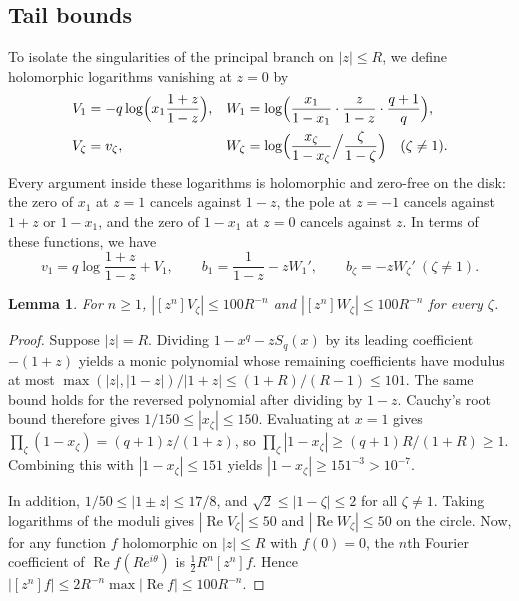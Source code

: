 \documentclass[11pt]{amsart}
\newtheorem{lemma}[theorem]{Lemma}
\theoremstyle{remark}
\begin{document}
\subsection{Tail bounds}
To isolate the singularities of the principal branch on $|z|\le R$, we define
holomorphic logarithms vanishing at $z=0$ by
\begin{align*}
 V_1&=-q\log\Bigl(x_1\frac{1+z}{1-z}\Bigr), &
 W_1&=\log\Bigl(\frac{x_1}{1-x_1}\cdot\frac{z}{1-z}\cdot\frac{q+1}{q}\Bigr),\\
 V_\zeta&=v_\zeta, &
 W_\zeta&=\log\Bigl(\frac{x_\zeta}{1-x_\zeta}\Big/\frac{\zeta}{1-\zeta}\Bigr)\quad(\zeta\ne1).
\end{align*}
Every argument inside these logarithms is holomorphic and zero-free on the
disk: the zero of $x_1$ at $z=1$ cancels against $1-z$, the pole at $z=-1$
cancels against $1+z$ or $1-x_1$, and the zero of $1-x_1$ at $z=0$ cancels
against $z$. In terms of these functions, we have
\begin{equation}\label{eq:VW}
 v_1=q\log\frac{1+z}{1-z}+V_1,\qquad b_1=\frac1{1-z}-zW_1',\qquad b_\zeta=-zW_\zeta'\ (\zeta\ne1).
\end{equation}

\begin{lemma}\label{lem:tail}
For $n\ge1$, $|[z^n]V_\zeta|\le100R^{-n}$ and $|[z^n]W_\zeta|\le100R^{-n}$ for every $\zeta$.
\end{lemma}

\begin{proof}
Suppose $|z|=R$. Dividing $1-x^q-zS_q(x)$ by its leading coefficient $-(1+z)$
yields a monic polynomial whose remaining coefficients have modulus at most
$\max(|z|,|1-z|)/|1+z|\le(1+R)/(R-1)\le101$. The same bound holds for the
reversed polynomial after dividing by $1-z$. Cauchy's root bound therefore
gives $1/150\le|x_\zeta|\le150$. Evaluating at $x=1$ gives
$\prod_\zeta(1-x_\zeta)=(q+1)z/(1+z)$, so
$\prod_\zeta|1-x_\zeta|\ge(q+1)R/(1+R)\ge1$. Combining this with
$|1-x_\zeta|\le151$ yields $|1-x_\zeta|\ge151^{-3}>10^{-7}$.

In addition, $1/50\le|1\pm z|\le17/8$, and $\sqrt2\le|1-\zeta|\le2$ for all
$\zeta\ne1$. Taking logarithms of the moduli gives
$|\operatorname{Re}V_\zeta|\le50$ and $|\operatorname{Re}W_\zeta|\le50$ on the
circle. Now, for any function $f$ holomorphic on $|z|\le R$ with $f(0)=0$, the
$n$th Fourier coefficient of $\operatorname{Re}f(Re^{i\theta})$ is
$\frac12R^n[z^n]f$. Hence
$|[z^n]f|\le2R^{-n}\max|\operatorname{Re}f|\le100R^{-n}$.
\end{proof}
\end{document}

